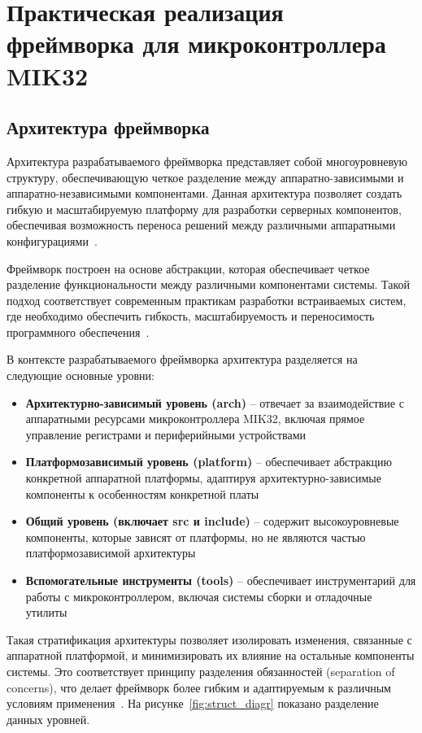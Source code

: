 \chapter{Практическая реализация фреймворка для микроконтроллера MIK32}

\label{cha:framework}

\section{Архитектура фреймворка}

Архитектура разрабатываемого фреймворка представляет собой многоуровневую структуру, обеспечивающую четкое разделение между аппаратно-зависимыми и аппаратно-независимыми компонентами. Данная архитектура позволяет создать гибкую и масштабируемую платформу для разработки серверных компонентов, обеспечивая возможность переноса решений между различными аппаратными конфигурациями~\cite{mikron_mik32_amur}.

Фреймворк построен на основе абстракции, которая обеспечивает четкое разделение функциональности между различными компонентами системы. Такой подход соответствует современным практикам разработки встраиваемых систем, где необходимо обеспечить гибкость, масштабируемость и переносимость программного обеспечения~\cite{embedded_abstraction_layers}.

В контексте разрабатываемого фреймворка архитектура разделяется на следующие основные уровни:

\begin{itemize}
	\item \textbf{Архитектурно-зависимый уровень (arch)} -- отвечает за взаимодействие с аппаратными ресурсами микроконтроллера MIK32, включая прямое управление регистрами и периферийными устройствами
	\item \textbf{Платформозависимый уровень (platform)} -- обеспечивает абстракцию конкретной аппаратной платформы, адаптируя архитектурно-зависимые компоненты к особенностям конкретной платы
	\item \textbf{Общий уровень (включает src и include)} -- содержит высокоуровневые компоненты, которые зависят от платформы, но не являются частью платформозависимой архитектуры
	\item \textbf{Вспомогательные инструменты (tools)} -- обеспечивает инструментарий для работы с микроконтроллером, включая системы сборки и отладочные утилиты
\end{itemize}

Такая стратификация архитектуры позволяет изолировать изменения, связанные с аппаратной платформой, и минимизировать их влияние на остальные компоненты системы. Это соответствует принципу разделения обязанностей (separation of concerns), что делает фреймворк более гибким и адаптируемым к различным условиям применения~\cite{layered_architecture_embedded}. На рисунке~\ref{fig:struct_diagr} показано разделение данных уровней.

